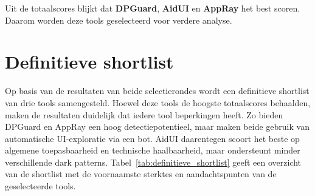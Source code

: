Uit de totaalscores blijkt dat \textbf{DPGuard}, \textbf{AidUI} en \textbf{AppRay} het best scoren. Daarom worden deze tools geselecteerd voor verdere analyse.

\newpage

\section{Definitieve shortlist}
\label{sec:defshortlist}

\vspace{1em}

Op basis van de resultaten van beide selectierondes wordt een definitieve shortlist van drie tools samengesteld. Hoewel deze tools de hoogste totaalscores behaalden, maken de resultaten duidelijk dat iedere tool beperkingen heeft. Zo bieden DPGuard en AppRay een hoog detectiepotentieel, maar maken beide gebruik van automatische UI-exploratie via een bot. AidUI daarentegen scoort het beste op algemene toepasbaarheid en technische haalbaarheid, maar ondersteunt minder verschillende dark patterns. Tabel~\ref{tab:definitieve_shortlist} geeft een overzicht van de shortlist met de voornaamste sterktes en aandachtspunten van de geselecteerde tools.

\vspace{1em}

